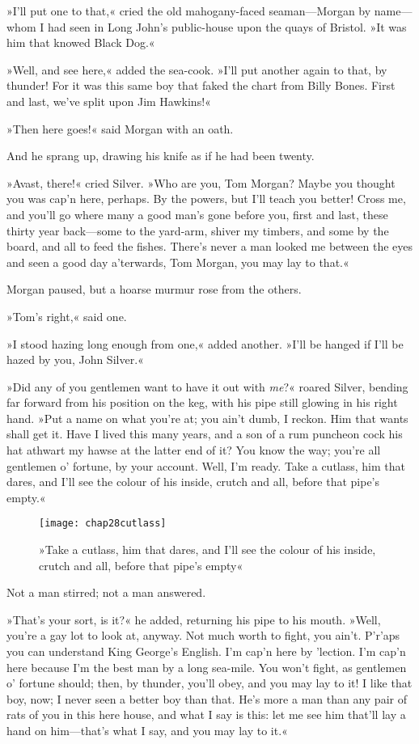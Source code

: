 »I'll put one to that,« cried the old mahogany-faced seaman—Morgan by name—whom I had seen in Long John's public-house upon the quays of Bristol. »It was him that knowed Black Dog.«

»Well, and see here,« added the sea-cook. »I'll put another again to that, by thunder! For it was this same boy that faked the chart from Billy Bones. First and last, we've split upon Jim Hawkins!«

»Then here goes!« said Morgan with an oath.

And he sprang up, drawing his knife as if he had been twenty.

»Avast, there!« cried Silver. »Who are you, Tom Morgan? Maybe you thought you was cap'n here, perhaps. By the powers, but I'll teach you better! Cross me, and you'll go where many a good man's gone before you, first and last, these thirty year back—some to the yard-arm, shiver my timbers, and some by the board, and all to feed the fishes. There's never a man looked me between the eyes and seen a good day a'terwards, Tom Morgan, you may lay to that.«

Morgan paused, but a hoarse murmur rose from the others.

»Tom's right,« said one.

»I stood hazing long enough from one,« added another. »I'll be hanged if I'll be hazed by you, John Silver.«

»Did any of you gentlemen want to have it out with \textit{me}?« roared Silver, bending far forward from his position on the keg, with his pipe still glowing in his right hand. »Put a name on what you're at; you ain't dumb, I reckon. Him that wants shall get it. Have I lived this many years, and a son of a rum puncheon cock his hat athwart my hawse at the latter end of it? You know the way; you're all gentlemen o' fortune, by your account. Well, I'm ready. Take a cutlass, him that dares, and I'll see the colour of his inside, crutch and all, before that pipe's empty.«

\begin{sidewaysfigure}
\texttt{[image: chap28cutlass]}%
\caption[»Take a cutlass, him that dares«]{»Take a cutlass, him that dares, and I'll see the colour of his inside, crutch and all, before that pipe's empty«}
\end{sidewaysfigure} 

Not a man stirred; not a man answered.

»That's your sort, is it?« he added, returning his pipe to his mouth. »Well, you're a gay lot to look at, anyway. Not much worth to fight, you ain't. P'r'aps you can understand King George's English. I'm cap'n here by 'lection. I'm cap'n here because I'm the best man by a long sea-mile. You won't fight, as gentlemen o' fortune should; then, by thunder, you'll obey, and you may lay to it! I like that boy, now; I never seen a better boy than that. He's more a man than any pair of rats of you in this here house, and what I say is this: let me see him that'll lay a hand on him—that's what I say, and you may lay to it.«

